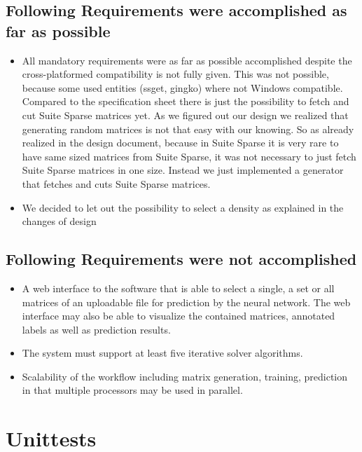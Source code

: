 \documentclass[parskip=full]{scrartcl}
\begin{document}
\subsection{Following Requirements were accomplished as far as possible}
\begin{itemize}

\item All mandatory requirements were as far as possible accomplished despite the cross-platformed compatibility is not fully given. 
This was not possible, because some used entities (ssget, gingko) where not Windows compatible.
Compared to the specification sheet there is just the possibility to fetch and cut Suite Sparse matrices yet.
As we figured out our design we realized that generating random matrices is not that easy with our knowing.
So as already realized in the design document, because in Suite Sparse it is very rare to have same sized matrices from Suite Sparse, it was not necessary to just fetch Suite Sparse matrices in one size. 
Instead we just implemented a generator that fetches and cuts Suite Sparse matrices.

\item We decided to let out the possibility to select a density as explained in the changes of design

\end{itemize}


\subsection{Following Requirements were not accomplished}
\begin{itemize}
\item A web interface to the software that is able to select a single, a set or all matrices of an uploadable file for prediction by the neural network. The web interface may also be able to visualize the contained matrices, annotated labels as well as prediction results.

\item The system must support at least five iterative solver algorithms. 

\item Scalability of the workflow including matrix generation, training, prediction in that multiple processors may be used in parallel.

\end{itemize}

\section{Unittests}
\end{document}
